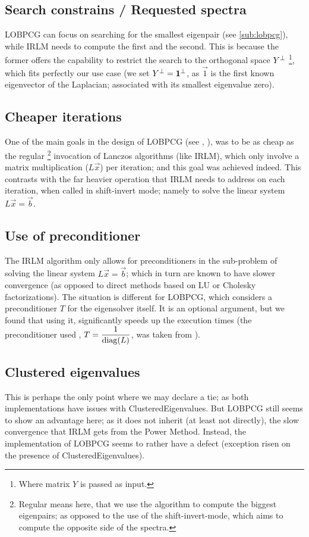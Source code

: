 \subsection{Search constrains / Requested spectra}

\gls{LOBPCG} can focus on searching for the smallest eigenpair (see
\cref{sub:lobpcg}), while \gls{IRLM} needs to compute the first and the
second. This is because the former offers the capability to restrict
the search to the orthogonal space ${Y}^{\bot}$ \footnote{Where matrix
  $Y$ is passed as input.}, which fits perfectly our use case (we set
${Y}^{\bot} = {\mathbf{1}}^{\bot}$, as $\vec{1}$ is the first known
eigenvector of the \gls{Laplacian}; associated with its smallest
eigenvalue zero).

\subsection{Cheaper iterations}

One of the main goals in the design of \gls{LOBPCG} (see
\cite{knyazev01}, \cite{knyazev03}),
was to be as cheap as the regular \footnote{Regular means here, that
  we use
  the algorithm to compute the biggest eigenpairs; as opposed to the
  use of the shift-invert-mode, which aims to compute the opposite
  side of the spectra.} invocation of Lanczos
algorithms (like \gls{IRLM}), which only involve a matrix
multiplication ($L\vec{x}$) per iteration; and this goal was achieved
indeed. This contrasts with the far heavier operation that \gls{IRLM}
needs to address on each iteration, when called in shift-invert mode;
namely to solve the linear system $L\vec{x} = \vec{b}$.  


\subsection{Use of preconditioner}

The \gls{IRLM} algorithm only allows for preconditioners in the
sub-problem of solving the linear system $L\vec{x} = \vec{b}$; which
in turn are known to have slower convergence (as opposed to direct
methods based on LU or Cholesky factorizations). The situation is
different for \gls{LOBPCG}, which considers a preconditioner $T$ for
the eigensolver itself. It is an optional argument, but we found that using
it, significantly speeds up the execution times (the preconditioner
used , $T = \dfrac{1}{\operatorname{diag}(L)} $, was taken from \cite{networkx}).

\subsection{Clustered eigenvalues}

This is perhaps the only point where we may declare a tie; as both
implementations have issues with \gls{ClusteredEigenvalues}. But
\gls{LOBPCG} still seems to show an advantage here; as it does not
inherit (at least not directly), the slow convergence that \gls{IRLM}
gets from the Power Method. Instead, the implementation of
\gls{LOBPCG} seems to rather have a defect (exception risen on the
presence of \gls{ClusteredEigenvalues}).

